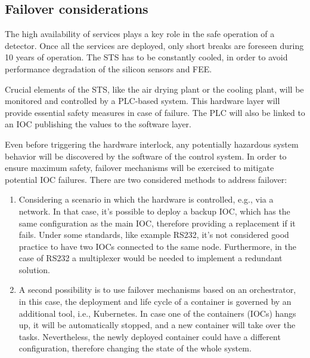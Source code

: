 \subsection{Failover considerations}
The high availability of services plays a key role in the safe operation of a detector. Once all the services are deployed, only short breaks are foreseen during 10 years of operation. The STS has to be constantly cooled, in order to avoid performance degradation of the silicon sensors and \gls{FEE}.

Crucial elements of the STS, like the air drying plant or the cooling plant, will be monitored and controlled by a \gls{PLC}-based system. This hardware layer will provide essential safety measures in case of failure. The \gls{PLC} will also be linked to an \gls{IOC} publishing the values to the software layer. 

Even before triggering the hardware interlock, any potentially hazardous system behavior will be discovered by the software of the control system. In order to ensure maximum safety, failover mechanisms will be exercised to mitigate potential \gls{IOC} failures. There are two considered methods to address failover:
\begin{enumerate}
    \item Considering a scenario in which the hardware is controlled, e.g., via a network. In that case, it's possible to deploy a backup \gls{IOC}, which has the same configuration as the main \gls{IOC}, therefore providing a replacement if it fails. Under some standards, like example RS232, it's not considered good practice to have two \glspl{IOC} connected to the same node. Furthermore, in the case of RS232 a multiplexer would be needed to implement a redundant solution. 
    \item A second possibility is to use failover mechanisms based on an orchestrator, in this case, the deployment and life cycle of a container is governed by an additional tool, i.e., Kubernetes. In case one of the containers (\glspl{IOC}) hangs up, it will be automatically stopped, and a new container will take over the tasks. Nevertheless, the newly deployed container could have a different configuration, therefore changing the state of the whole system. 
\end{enumerate}





